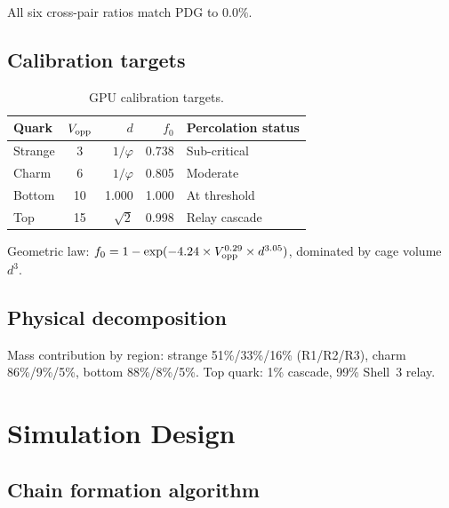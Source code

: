 \documentclass[11pt,letterpaper]{article}
\newcommand{\phig}{\varphi}
\begin{document}
All six cross-pair ratios match PDG to $0.0\%$.

\subsection{Calibration targets}

\begin{table}[H]
\centering
\caption{GPU calibration targets.}
\label{tab:targets}
\begin{tabular}{@{}lcrrl@{}}
\toprule
Quark & $V_{\rm opp}$ & $d$ & $f_0$ & Percolation status \\
\midrule
Strange & 3  & $1/\phig$ & 0.738 & Sub-critical \\
Charm   & 6  & $1/\phig$ & 0.805 & Moderate \\
Bottom  & 10 & 1.000     & 1.000 & At threshold \\
Top     & 15 & $\sqrt{2}$ & 0.998 & Relay cascade \\
\bottomrule
\end{tabular}
\end{table}

Geometric law: $f_0 = 1 - \exp(-4.24 \times V_{\rm opp}^{0.29}
\times d^{3.05})$, dominated by cage volume $d^3$.

\subsection{Physical decomposition}

Mass contribution by region: strange 51\%/33\%/16\%
(R1/R2/R3), charm 86\%/9\%/5\%, bottom 88\%/8\%/5\%.
Top quark: 1\% cascade, 99\% Shell~3 relay.

\section{Simulation Design}
\label{sec:simulation}

\subsection{Chain formation algorithm}
\end{document}
